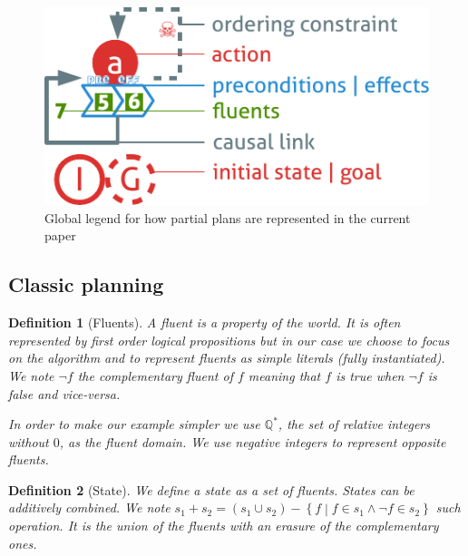 \documentclass[]{article}
\newtheorem{definition}{Definition}
\begin{document}
\begin{figure}[htbp]
\centering
\includegraphics{graphics/legend.pdf}
\caption{Global legend for how partial plans are represented in the
current paper\label{fig:legend}}
\end{figure}

\subsection{Classic planning}\label{classic-planning}

\begin{definition}[Fluents]

A fluent is a property of the world. It is often represented by first
order logical propositions but in our case we choose to focus on the
algorithm and to represent fluents as simple literals (fully
instantiated). We note \(\lnot f\) the complementary fluent of \(f\)
meaning that \(f\) is true when \(\lnot f\) is false and vice-versa.

In order to make our example simpler we use \(\mathbb{Q}^*\), the set of
relative integers without \(0\), as the fluent domain. We use negative
integers to represent opposite fluents.

\end{definition}

\begin{definition}[State]

We define a state as a set of fluents. States can be additively
combined. We note
\(s_1 + s_2 = \left( s_1 \cup s_2 \right) - \left\{ f \middle| f \in s_1 \land \lnot f \in s_2 \right\}\)
such operation. It is the union of the fluents with an erasure of the
complementary ones.

\end{definition}
\end{document}
